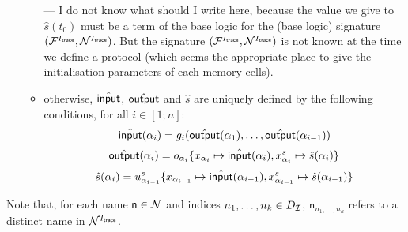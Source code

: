 \begin{definition}
\begin{itemize}
\begin{itemize}
{      ---
      I do not know what should I write here, because the value we give to
      $\hat{s}(t_0)$ must be a term of the base logic for the (base logic)
      signature $(\mathcal{F}^{I_{\textsf{trace}}},\mathcal{N}^{I_{\textsf{trace}}})$.
      But the signature $(\mathcal{F}^{I_{\textsf{trace}}},\mathcal{N}^{I_{\textsf{trace}}})$ is not known at the time
      we define a protocol (which seems the appropriate place to give the
      initialisation parameters of each memory cells).}
      \item otherwise, $\hat{\textsf{input}}$, $\hat{\textsf{output}}$ and $\hat{s}$
      are uniquely defined by the following
      conditions, for all $i\in[1;n]$:
      $$\hat{\textsf{input}}(\alpha_i) =
      g_{i}(\hat{\textsf{output}}(\alpha_1),\ldots,\hat{\textsf{output}}(\alpha_{i-1}))$$
      $$\hat{\textsf{output}}(\alpha_i) =
      o_{\alpha_i}\{x_{\alpha_i}\mapsto\hat{\textsf{input}}(\alpha_i),
      x^s_{\alpha_i}\mapsto\hat{s}(\alpha_i)\}$$
      $$\hat{s}(\alpha_i) = u_{\alpha_{i-1}}^{s}
      \{x_{\alpha_{i-1}}\mapsto\hat{\textsf{input}}(\alpha_{i-1}),
      x^s_{\alpha_{i-1}}\mapsto\hat{s}(\alpha_{i-1})\}$$
    \end{itemize}
  \end{itemize}
\end{definition}

Note that, for each name $\mathsf{n}\in \mathcal{N}$ and indices $n_1,\ldots,n_k \in
D_{\mathcal{I}}$, $\mathsf{n}_{n_1,\ldots,n_k}$ refers to a distinct name in $\mathcal{N}^{I_{\textsf{trace}}}$.

